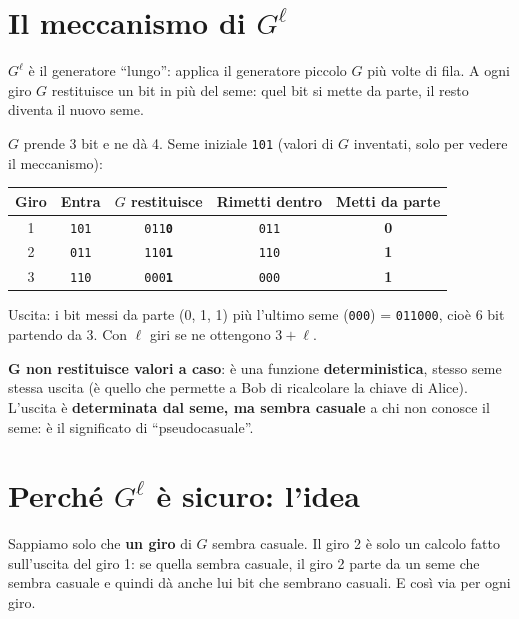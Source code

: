 \section{Il meccanismo di \texorpdfstring{\(G^\ell\)}{G\^{}l}}

\begin{inbreve}
\(G^\ell\) è il generatore ``lungo'': applica il generatore piccolo \(G\) più volte di fila. A ogni giro \(G\) restituisce un bit in più del seme: quel bit si mette da parte, il resto diventa il nuovo seme.
\end{inbreve}

\(G\) prende 3 bit e ne dà 4. Seme iniziale \texttt{101} (valori di \(G\) inventati, solo per vedere il meccanismo):

\begin{center}
\begin{tabular}{ccccc}
\toprule
Giro & Entra & \(G\) restituisce & Rimetti dentro & Metti da parte \\
\midrule
1 & \texttt{101} & \texttt{011}\textbf{\texttt{0}} & \texttt{011} & \textbf{0} \\
2 & \texttt{011} & \texttt{110}\textbf{\texttt{1}} & \texttt{110} & \textbf{1} \\
3 & \texttt{110} & \texttt{000}\textbf{\texttt{1}} & \texttt{000} & \textbf{1} \\
\bottomrule
\end{tabular}
\end{center}

Uscita: i bit messi da parte (0, 1, 1) più l'ultimo seme (\texttt{000}) = \texttt{011000}, cioè 6 bit partendo da 3. Con \(\ell\) giri se ne ottengono \(3 + \ell\).

\begin{nota}
\textbf{G non restituisce valori a caso}: è una funzione \textbf{deterministica}, stesso seme stessa uscita (è quello che permette a Bob di ricalcolare la chiave di Alice). L'uscita è \textbf{determinata dal seme, ma sembra casuale} a chi non conosce il seme: è il significato di ``pseudocasuale''.
\end{nota}

\section{Perché \texorpdfstring{\(G^\ell\)}{G\^{}l} è sicuro: l'idea}

\begin{inbreve}
Sappiamo solo che \textbf{un giro} di \(G\) sembra casuale. Il giro 2 è solo un calcolo fatto sull'uscita del giro 1: se quella sembra casuale, il giro 2 parte da un seme che sembra casuale e quindi dà anche lui bit che sembrano casuali. E così via per ogni giro.
\end{inbreve}

